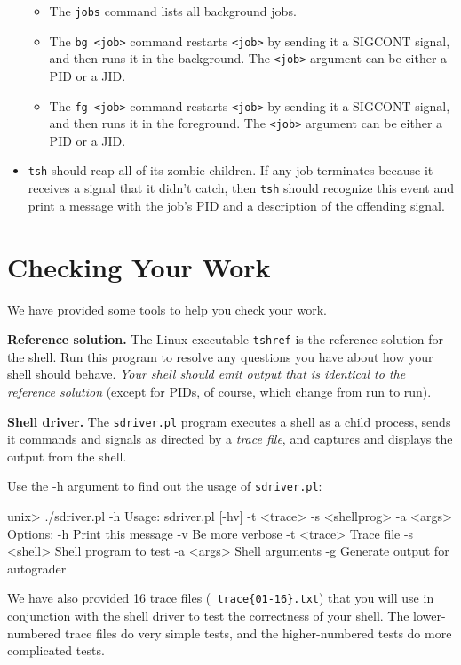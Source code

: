 \documentclass[11pt]{article}
\begin{document}
\begin{itemize}
\begin{itemize}
\item 
The {\tt jobs} command lists all background jobs. 

\item 
The {\tt bg <job>} command restarts {\tt <job>} by sending it a
SIGCONT signal, and then runs it in the background. The {\tt <job>}
argument can be either a PID or a JID. 

\item 
The {\tt fg <job>} command restarts {\tt <job>} by sending it
a SIGCONT signal, and then runs it in the foreground. The {\tt <job>} 
argument can be either a PID or a JID. 
\end{itemize}

\item {\tt tsh} should reap all of its zombie children.  If any job
terminates because it receives a signal that it didn't catch, then
{\tt tsh} should recognize this event and print a message with the
job's PID and a description of the offending signal.

\end{itemize}

\section*{Checking Your Work}

We have provided some tools to help you check your work.

{\bf Reference solution.} The Linux executable {\tt tshref} is the
reference solution for the shell. Run this program to resolve any
questions you have about how your shell should behave. {\em Your shell
should emit output that is identical to the reference solution} 
(except for PIDs, of course, which change from run to run).

{\bf Shell driver.} The {\tt sdriver.pl} program executes a shell as a
child process, sends it commands and signals as directed by a {\em
trace file}, and captures and displays the output from the shell.

Use the -h argument to find out the usage of {\tt sdriver.pl}:
\begin{tty}
unix> ./sdriver.pl -h
Usage: sdriver.pl [-hv] -t <trace> -s <shellprog> -a <args>
Options:
  -h            Print this message
  -v            Be more verbose
  -t <trace>    Trace file
  -s <shell>    Shell program to test
  -a <args>     Shell arguments
  -g            Generate output for autograder
\end{tty}

We have also provided 16 trace files ({\tt
trace\{01-16\}.txt}) that you will use in conjunction with the shell
driver to test the correctness of your shell. The lower-numbered trace
files do very simple tests, and the higher-numbered tests do more
complicated tests.
\end{document}
